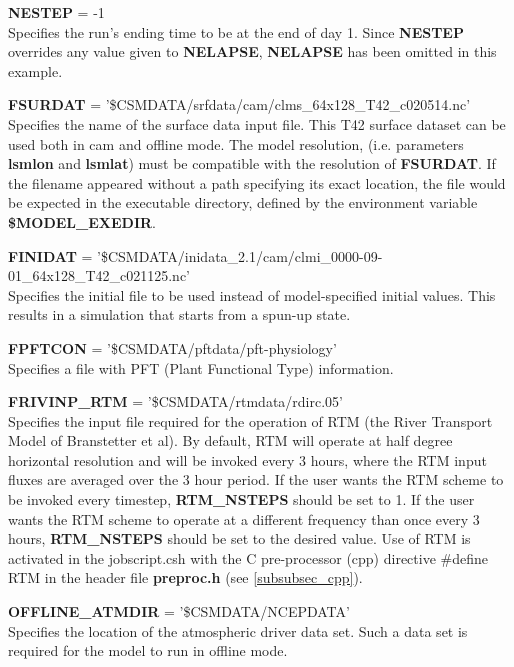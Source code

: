 \medskip \noindent 
{\bf NESTEP} = -1 \\
Specifies the run's ending time to be at the end of day 1. Since {\bf
NESTEP} overrides any value given to {\bf NELAPSE}, {\bf NELAPSE}
has been omitted in this example.

\medskip \noindent 
{\bf FSURDAT} = '\$CSMDATA/srfdata/cam/clms\_64x128\_T42\_c020514.nc' \\ 
Specifies the name of the surface data input file. This T42 surface
dataset can be used both in cam and offline mode.  The model
resolution, (i.e. parameters {\bf lsmlon} and {\bf lsmlat}) must be
compatible with the resolution of {\bf FSURDAT}.  If the filename
appeared without a path specifying its exact location, the file would
be expected in the executable directory, defined by the environment
variable {\bf \$MODEL\_EXEDIR}.

\medskip \noindent 
{\bf FINIDAT} = '\$CSMDATA/inidata\_2.1/cam/clmi\_0000-09-01\_64x128\_T42\_c021125.nc' \\

Specifies the initial file to be used instead of model-specified
initial values.  This results in a simulation that starts from a
spun-up state.

\medskip \noindent 
{\bf FPFTCON} = '\$CSMDATA/pftdata/pft-physiology' \\
Specifies a file with PFT (Plant Functional Type) information.  

\medskip \noindent 
{\bf FRIVINP\_RTM} = '\$CSMDATA/rtmdata/rdirc.05' \\
Specifies the input file required for the operation of RTM (the River
Transport Model of Branstetter et al). By default, RTM will operate at
half degree horizontal resolution and will be invoked every 3 hours,
where the RTM input fluxes are averaged over the 3 hour period.  If
the user wants the RTM scheme to be invoked every timestep, {\bf
RTM\_NSTEPS} should be set to 1. If the user wants the RTM scheme to
operate at a different frequency than once every 3 hours, {\bf
RTM\_NSTEPS} should be set to the desired value.  Use of RTM is
activated in the jobscript.csh with the C pre-processor (cpp) directive
\#define RTM in the header file {\bf preproc.h} (see \ref{subsubsec_cpp}).

\medskip \noindent 
{\bf OFFLINE\_ATMDIR} = '\$CSMDATA/NCEPDATA' \\
Specifies the location of the atmospheric driver data set. Such a data
set is required for the model to run in offline mode.

